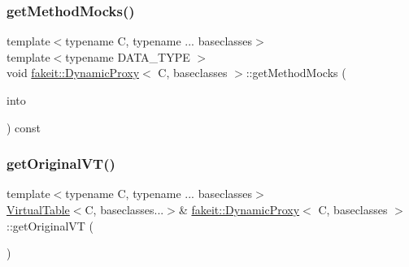 \subsubsection{\texorpdfstring{getMethodMocks()}{getMethodMocks()}\hspace{0.1cm}{\footnotesize\ttfamily [9/9]}}
{\footnotesize\ttfamily template$<$typename C, typename ... baseclasses$>$ \\
template$<$typename D\+A\+T\+A\+\_\+\+T\+Y\+PE $>$ \\
void \mbox{\hyperlink{structfakeit_1_1DynamicProxy}{fakeit\+::\+Dynamic\+Proxy}}$<$ C, baseclasses $>$\+::get\+Method\+Mocks (\begin{DoxyParamCaption}\item[{std\+::vector$<$ D\+A\+T\+A\+\_\+\+T\+Y\+PE $>$ \&}]{into }\end{DoxyParamCaption}) const\hspace{0.3cm}{\ttfamily [inline]}}

\mbox{\label{structfakeit_1_1DynamicProxy_aa34a496518156007196fd405dbf2e058}} 
\subsubsection{\texorpdfstring{getOriginalVT()}{getOriginalVT()}\hspace{0.1cm}{\footnotesize\ttfamily [1/9]}}
{\footnotesize\ttfamily template$<$typename C, typename ... baseclasses$>$ \\
\mbox{\hyperlink{structfakeit_1_1VirtualTable}{Virtual\+Table}}$<$C, baseclasses...$>$\& \mbox{\hyperlink{structfakeit_1_1DynamicProxy}{fakeit\+::\+Dynamic\+Proxy}}$<$ C, baseclasses $>$\+::get\+Original\+VT (\begin{DoxyParamCaption}{ }\end{DoxyParamCaption})\hspace{0.3cm}{\ttfamily [inline]}}

\mbox{\label{structfakeit_1_1DynamicProxy_aa34a496518156007196fd405dbf2e058}} 
